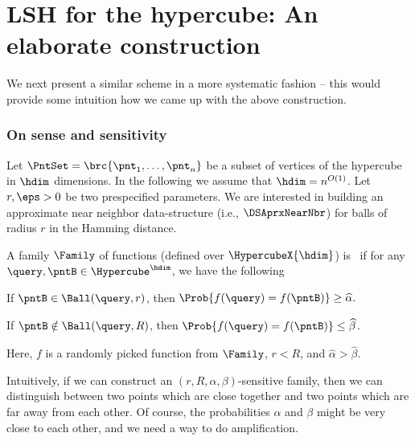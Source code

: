 
\section{LSH for the hypercube: An elaborate construction}

We next present a similar scheme in a more systematic fashion -- this
would provide some intuition how we came up with the above
construction.

\subsubsection{On sense and sensitivity}

Let $\PntSet = \brc{\pnt_1,\ldots, \pnt_n}$ be a subset of vertices of
the hypercube in $\hdim$ dimensions. In the following we assume that
$\hdim = n^{O(1)}$. Let $r,\eps>0$ be two prespecified parameters. We
are interested in building an approximate near neighbor data-structure
(i.e., $\DSAprxNearNbr$) for balls of radius $r$ in the Hamming
distance.


\begin{defn}
    A family $\Family$ of functions (defined over
    $\HypercubeX{\hdim}$) is
    \,
     if for any
    $\query, \pntB \in \Hypercube^\hdim$, we have the following
    \begin{compactenumA}
        \smallskip
        \item If $\pntB \in \Ball( \query, r)$, then
        \begin{math}
            \Prob{ f(\query) = f(\pntB)\bigr. } \geq \widehat{\alpha}.
        \end{math}

        \smallskip

        \item If $\pntB \notin \Ball( \query, R)$, then
        $\Prob{ \bigl. f(\query) = f(\pntB) } \leq \widehat{\beta}$.
    \end{compactenumA}
    \smallskip%
    Here, $f$ is a randomly picked function from $\Family$, $r < R$,
    and $\widehat{\alpha} > \widehat{\beta}$.
\end{defn}

Intuitively, if we can construct an $(r, R, \alpha, \beta)$-sensitive
family, then we can distinguish between two points which are close
together and two points which are far away from each other. Of course,
the probabilities $\alpha$ and $\beta$ might be very close to each
other, and we need a way to do amplification.

